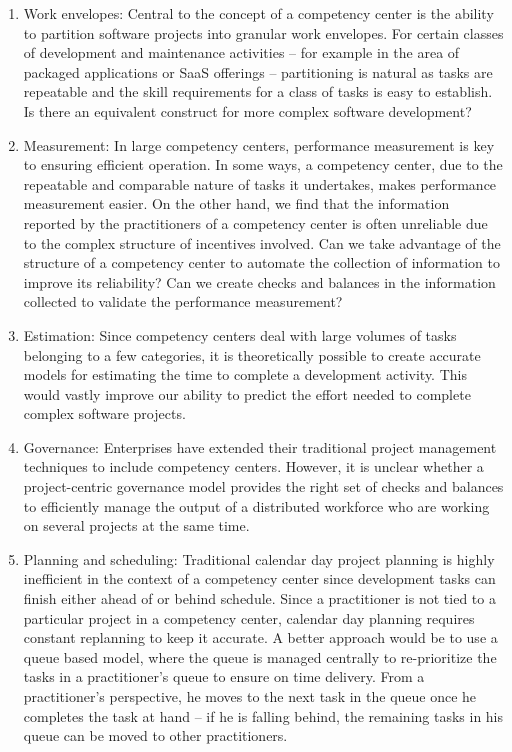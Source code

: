 \begin{enumerate}
\item Work envelopes: Central to the concept of a competency center is the ability to partition software projects into granular work envelopes. For certain classes of development and maintenance activities -- for example in the area of packaged applications or SaaS offerings -- partitioning is natural as tasks are repeatable and the skill requirements for a class of tasks is easy to establish. Is there an equivalent construct for more complex software development?
\item Measurement: In large competency centers, performance measurement is key to ensuring efficient operation. In some ways, a competency center, due to the repeatable and comparable nature of tasks it undertakes, makes performance measurement easier. On the other hand, we find that the information reported by the practitioners of a competency center is often unreliable due to the complex structure of incentives involved. Can we take advantage of the structure of a competency center to automate the collection of information to improve its reliability? Can we create checks and balances in the information collected to validate the performance measurement?
\item Estimation: Since competency centers deal with large volumes of tasks belonging to a few categories, it is theoretically possible to create accurate models for estimating the time to complete a development activity. This would vastly improve our ability to predict the effort needed to complete complex software projects.
\item Governance: Enterprises have extended their traditional project management techniques to include competency centers. However, it is unclear whether a project-centric governance model provides the right set of checks and balances to efficiently manage the output of a distributed workforce who are working on several projects at the same time.
\item Planning and scheduling: Traditional calendar day project planning is highly inefficient in the context of a competency center since development tasks can finish either ahead of or behind schedule. Since a practitioner is not tied to a particular project in a competency center, calendar day planning requires constant replanning to keep it accurate. A better approach would be to use a queue based model, where the queue is managed centrally to re-prioritize the tasks in a practitioner's queue to ensure on time delivery. From a practitioner's perspective, he moves to the next task in the queue once he completes the task at hand -- if he is falling behind, the remaining tasks in his queue can be moved to other practitioners.
\end{enumerate}

